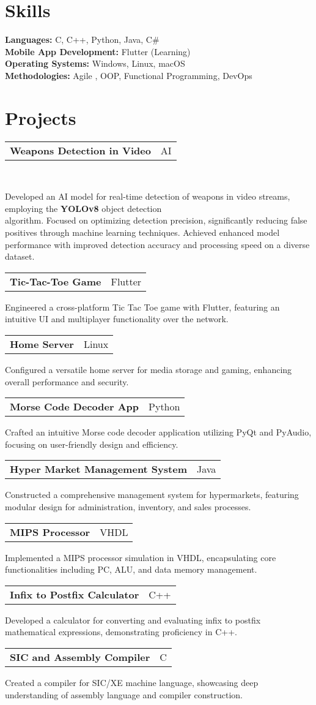 \documentclass[letterpaper,11pt]{article}
\makeatletter
\newcommand{\resumeItem}[1]{\item\small{{#1 \vspace{-2pt}}}}
\newcommand{\resumeProjectHeading}[2]{\vspace{-2pt}\item
    \begin{tabular*}{0.97\textwidth}{l@{\extracolsep{\fill}}r}
      \small#1 & #2 \\
    \end{tabular*}\vspace{-7pt}
}
\makeatother
\begin{document}
\section{Skills}
\resumeSubHeadingListStart
    \small{\item{
        \textbf{Languages:} C, C++, Python, Java, C\# \\
        \textbf{Mobile App Development:} Flutter (Learning)\\
        \textbf{Operating Systems:} Windows, Linux, macOS \\
        \textbf{Methodologies:}{ Agile , OOP, Functional Programming, DevOps}
}
\resumeSubHeadingListEnd

\section{Projects}
\resumeSubHeadingListStart
    \resumeProjectHeading
          {\textbf{Weapons Detection in Video}}{AI}\\
              \resumeItem{Developed an AI model for real-time detection of weapons in video streams, employing the \textbf{YOLOv8} object detection\\ algorithm. Focused on optimizing detection precision, significantly reducing false positives through machine learning techniques. Achieved enhanced model performance with improved detection accuracy and processing speed on a diverse dataset.}
    \resumeProjectHeading
          {\textbf{Tic-Tac-Toe Game}}{Flutter}
          \resumeItem{Engineered a cross-platform Tic Tac Toe game with Flutter, featuring an intuitive UI and multiplayer functionality over the network.\\}
    \resumeProjectHeading
          {\textbf{Home Server}}{Linux}
          \resumeItem{Configured a versatile home server for media storage and gaming, enhancing overall performance and security.}
    \resumeProjectHeading
          {\textbf{Morse Code Decoder App}}{Python}
          \resumeItem{Crafted an intuitive Morse code decoder application utilizing PyQt and PyAudio, focusing on user-friendly design and efficiency.}
    \resumeProjectHeading
          {\textbf{Hyper Market Management System}}{Java}
          \resumeItem{Constructed a comprehensive management system for hypermarkets, featuring modular design for administration, inventory, and sales processes.}
    \resumeProjectHeading
          {\textbf{MIPS Processor}}{VHDL}
          \resumeItem{Implemented a MIPS processor simulation in VHDL, encapsulating core functionalities including PC, ALU, and data memory management.}
    \resumeProjectHeading
          {\textbf{Infix to Postfix Calculator}}{C++}
          \resumeItem{Developed a calculator for converting and evaluating infix to postfix mathematical expressions, demonstrating proficiency in C++.}
    \resumeProjectHeading
          {\textbf{SIC and Assembly Compiler}}{C}
          \resumeItem{Created a compiler for SIC/XE machine language, showcasing deep understanding of assembly language and compiler construction.}
\resumeSubHeadingListEnd


}
\end{document}
